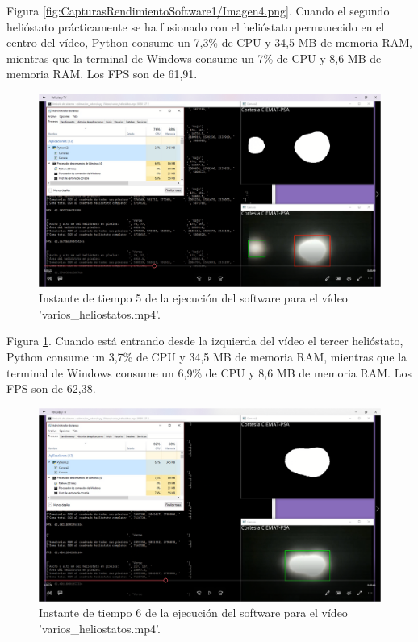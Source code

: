 Figura \ref{fig:CapturasRendimientoSoftware1/Imagen4.png}. Cuando el segundo helióstato prácticamente se ha fusionado con el helióstato permanecido en el centro del vídeo, Python consume un 7,3\% de CPU y 34,5 MB de memoria RAM, mientras que la terminal de Windows consume un 7\% de CPU y 8,6 MB de memoria RAM. Los FPS son de 61,91.

\begin{figure}[h!]
  	\centering
	\includegraphics[width=\textwidth]{CapturasRendimientoSoftware1/Imagen5.png}
	\caption{Instante de tiempo 5 de la ejecución del software para el vídeo 'varios\_heliostatos.mp4'.
	\label{fig:CapturasRendimientoSoftware1/Imagen5.png}}
\end{figure}

Figura \ref{fig:CapturasRendimientoSoftware1/Imagen5.png}. Cuando está entrando desde la izquierda del vídeo el tercer helióstato, Python consume un 3,7\% de CPU y 34,5 MB de memoria RAM, mientras que la terminal de Windows consume un 6,9\% de CPU y 8,6 MB de memoria RAM. Los FPS son de 62,38.

\begin{figure}[h!]
  	\centering
	\includegraphics[width=\textwidth]{CapturasRendimientoSoftware1/Imagen6.png}
	\caption{Instante de tiempo 6 de la ejecución del software para el vídeo 'varios\_heliostatos.mp4'.
	\label{fig:CapturasRendimientoSoftware1/Imagen6.png}}
\end{figure}

